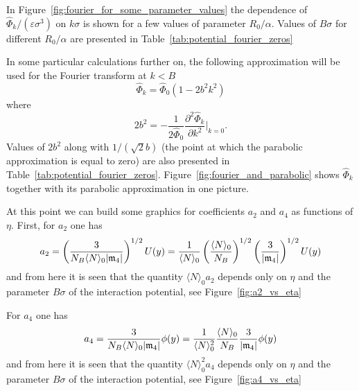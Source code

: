 In Figure~\ref{fig:fourier_for_some_parameter_values} the dependence of $\hat{\Phi}_k/(\varepsilon\sigma^3)$ on $k\sigma$ is shown for a few values of parameter $R_0/\alpha$. Values of $B\sigma$ for different $R_0/\alpha$ are presented in Table~\ref{tab:potential_fourier_zeros}

In some particular calculations further on, the following approximation will be used for the Fourier transform at $k<B$
\begin{equation}
	\hat{\Phi}_k = \hat{\Phi}_0(1 - 2b^2k^2)
\end{equation}
where 
\begin{equation}
	2b^2 = -\frac{1}{2\hat{\Phi}_0} \frac{\partial^2 \hat{\Phi}_k}{\partial k^2} \bigg|_{k=0}.
\end{equation}
Values of $2b^2$ along with $1/(\sqrt{2}b)$ (the point at which the parabolic approximation is equal to zero) are also presented in Table~\ref{tab:potential_fourier_zeros}. Figure~\ref{fig:fourier_and_parabolic} shows $\hat{\Phi}_k$ together with its parabolic approximation in one picture.

At this point we can build some graphics for coefficients $a_2$ and $a_4$ as functions of $\eta$.
First, for $a_2$ one has
\begin{equation}
	a_2 = \left(\frac{3}{N_B \langle N \rangle_0 \abs{\mathfrak{m}_4}}\right)^{1/2} U(y) 
	= \frac{1}{\langle N \rangle_0} \left(\frac{\langle N \rangle_0}{N_B}\right)^{1/2} \left(\frac{3}{\abs{\mathfrak{m}_4}}\right)^{1/2} U(y)
\end{equation}
and from here it is seen that the quantity $\langle N \rangle_0 a_2$ depends only on $\eta$ and the parameter $B\sigma$ of the interaction potential, see Figure~\ref{fig:a2_vs_eta}

For $a_4$ one has
\begin{equation}
	a_4 = \frac{3}{N_B \langle N \rangle_0 \abs{\mathfrak{m}_4}} \phi(y) = \frac{1}{\langle N \rangle_0^2} \frac{\langle N \rangle_0}{N_B} \frac{3}{\abs{\mathfrak{m}_4}} \phi(y)
\end{equation}
and from here it is seen that the quantity $\langle N \rangle_0^2 a_4$ depends only on $\eta$ and the parameter $B\sigma$ of the interaction potential, see Figure~\ref{fig:a4_vs_eta}

